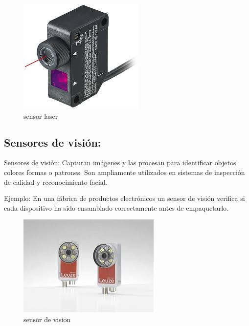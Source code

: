 \begin{figure}[h]
	\centering
	\includegraphics[width=0.7\linewidth]{img/sensor laser.jpg}
	\caption{sensor laser }
	\label{fig:insertarimagen}
\end{figure}

\subsection{Sensores de visión:  }

Sensores de visión: Capturan imágenes y las procesan para identificar objetos colores formas o patrones. Son ampliamente utilizados en sistemas de inspección de calidad y reconocimiento facial.

Ejemplo: En una fábrica de productos electrónicos un sensor de visión verifica si cada dispositivo ha sido ensamblado correctamente antes de empaquetarlo.

\begin{figure}[h]
	\centering
	\includegraphics[width=0.7\linewidth]{img/sensor de vision.jpg}
	\caption{sensor de vision}
	\label{fig:insertarimagen}
\end{figure}

